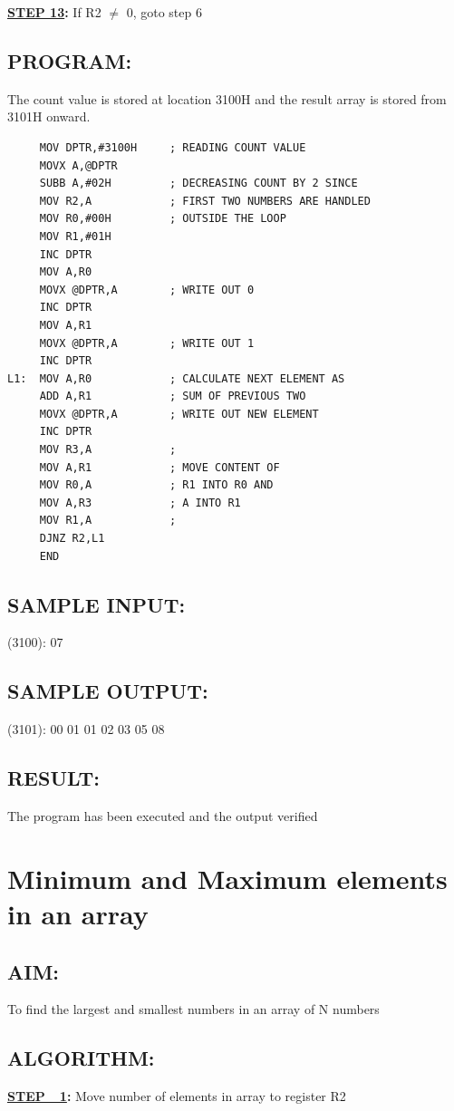 \documentclass[a4paper,28pt]{report}
\begin{document}
\textbf{\underline{STEP 13}:} If R2 $\neq$ 0, goto step 6 
\newpage
\section*{PROGRAM:}
The count value is stored at location 3100H and the result array is stored from 3101H onward.
\newline
\begin{lstlisting}
     MOV DPTR,#3100H     ; READING COUNT VALUE
     MOVX A,@DPTR
     SUBB A,#02H         ; DECREASING COUNT BY 2 SINCE
     MOV R2,A            ; FIRST TWO NUMBERS ARE HANDLED
     MOV R0,#00H         ; OUTSIDE THE LOOP
     MOV R1,#01H
     INC DPTR
     MOV A,R0
     MOVX @DPTR,A        ; WRITE OUT 0
     INC DPTR
     MOV A,R1
     MOVX @DPTR,A        ; WRITE OUT 1
     INC DPTR
L1:  MOV A,R0            ; CALCULATE NEXT ELEMENT AS
     ADD A,R1            ; SUM OF PREVIOUS TWO
     MOVX @DPTR,A        ; WRITE OUT NEW ELEMENT
     INC DPTR
     MOV R3,A            ;
     MOV A,R1            ; MOVE CONTENT OF
     MOV R0,A            ; R1 INTO R0 AND
     MOV A,R3            ; A INTO R1
     MOV R1,A            ;
     DJNZ R2,L1
     END
\end{lstlisting}

\section*{SAMPLE INPUT:}
(3100): 07
\section*{SAMPLE OUTPUT:}
(3101): 00 01 01 02 03 05 08
\section*{RESULT:}
The program has been executed and the output verified
%
%
%
\chapter{Minimum and Maximum elements in an array}
%
%
\section*{AIM:}To find the largest and smallest numbers in an array of N numbers

\section*{ALGORITHM:}
\textbf{\underline{STEP\ \ 1}:} Move number of elements in array to register R2
\end{document}

